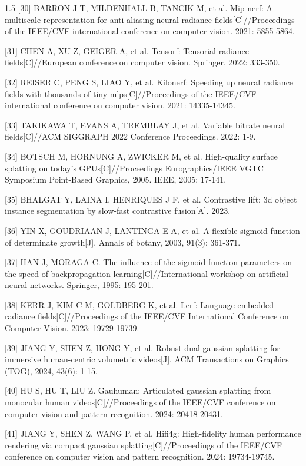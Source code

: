 \documentclass[zihao=-4]{ctexart}
\begin{document}
\begin{spacing}{1.5}
[30] BARRON J T, MILDENHALL B, TANCIK M, et al. Mip-nerf: A multiscale representation for anti-aliasing neural radiance fields[C]//Proceedings of the IEEE/CVF international conference on computer vision. 2021: 5855-5864.

[31] CHEN A, XU Z, GEIGER A, et al. Tensorf: Tensorial radiance fields[C]//European conference on computer vision. Springer, 2022: 333-350.

[32] REISER C, PENG S, LIAO Y, et al. Kilonerf: Speeding up neural radiance fields with thousands of tiny mlps[C]//Proceedings of the IEEE/CVF international conference on computer vision. 2021: 14335-14345.

[33] TAKIKAWA T, EVANS A, TREMBLAY J, et al. Variable bitrate neural fields[C]//ACM SIGGRAPH 2022 Conference Proceedings. 2022: 1-9.

[34] BOTSCH M, HORNUNG A, ZWICKER M, et al. High-quality surface splatting on today’s GPUs[C]//Proceedings Eurographics/IEEE VGTC Symposium Point-Based Graphics, 2005. IEEE, 2005: 17-141.

[35] BHALGAT Y, LAINA I, HENRIQUES J F, et al. Contrastive lift: 3d object instance segmentation by slow-fast contrastive fusion[A]. 2023.

[36] YIN X, GOUDRIAAN J, LANTINGA E A, et al. A flexible sigmoid function of determinate growth[J]. Annals of botany, 2003, 91(3): 361-371.

[37] HAN J, MORAGA C. The influence of the sigmoid function parameters on the speed of backpropagation learning[C]//International workshop on artificial neural networks. Springer, 1995: 195-201.

[38] KERR J, KIM C M, GOLDBERG K, et al. Lerf: Language embedded radiance fields[C]//Proceedings of the IEEE/CVF International Conference on Computer Vision. 2023: 19729-19739.

[39] JIANG Y, SHEN Z, HONG Y, et al. Robust dual gaussian splatting for immersive human-centric volumetric videos[J]. ACM Transactions on Graphics (TOG), 2024, 43(6): 1-15.

[40] HU S, HU T, LIU Z. Gauhuman: Articulated gaussian splatting from monocular human videos[C]//Proceedings of the IEEE/CVF conference on computer vision and pattern recognition. 2024: 20418-20431.

[41] JIANG Y, SHEN Z, WANG P, et al. Hifi4g: High-fidelity human performance rendering via compact gaussian splatting[C]//Proceedings of the IEEE/CVF conference on computer vision and pattern recognition. 2024: 19734-19745.


\end{spacing}
\end{document}

